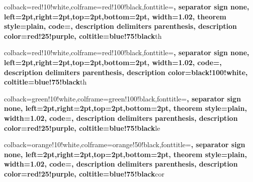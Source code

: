 \usepackage[utf8]{inputenc}
\usepackage[T1]{fontenc}
\usepackage{lmodern}
\usepackage{amsmath, amssymb}
\usepackage{graphicx}
\usepackage{hyperref}
\usepackage{geometry}
\usepackage{fancyhdr}
\usepackage{enumitem}
\usepackage{listings}
\usepackage{xcolor}
\usepackage{algorithm2e}
\usepackage{algorithmicx}
\usepackage{tcolorbox}
\usepackage{amsmath}
\usepackage{amsthm}
\usepackage{amsfonts}
\usepackage{amssymb}
\usepackage{setspace}




%
{colback=red!10!white,colframe=red!100!black,fonttitle=\bfseries, separator sign none,
left=2pt,right=2pt,top=2pt,bottom=2pt,
width=1.02\linewidth,
theorem style=plain,
code={\onehalfspacing},
description delimiters parenthesis, description color=red!25!purple,
coltitle=blue!75!black}{th}

%
{colback=red!10!white,colframe=red!100!black,fonttitle=\bfseries, separator sign none,
left=2pt,right=2pt,top=2pt,bottom=2pt,
width=1.02\linewidth,
code={\onehalfspacing},
description delimiters parenthesis, description color=black!100!white,
coltitle=blue!75!black}{th}


%
{colback=green!10!white,colframe=green!100!black,fonttitle=\bfseries, separator sign none,
left=2pt,right=2pt,top=2pt,bottom=2pt,
theorem style=plain,
width=1.02\linewidth,
code={\onehalfspacing},
description delimiters parenthesis, description color=red!25!purple,
coltitle=blue!75!black}{le}

%
{colback=orange!10!white,colframe=orange!50!black,fonttitle=\bfseries, separator sign none,
left=2pt,right=2pt,top=2pt,bottom=2pt,
theorem style=plain,
width=1.02\linewidth,
code={\onehalfspacing},
description delimiters parenthesis, description color=red!25!purple,
coltitle=blue!75!black}{cor}


